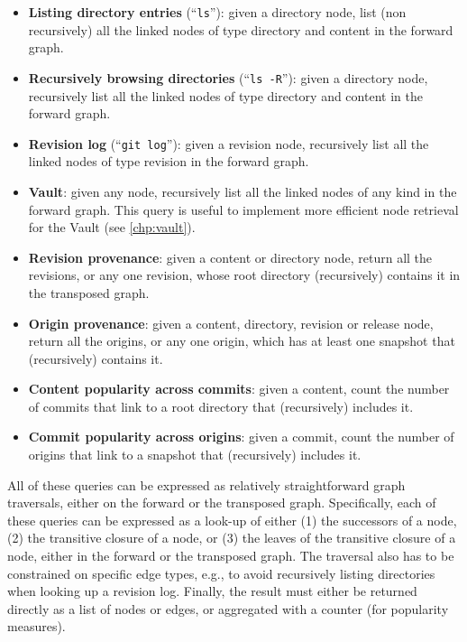 \begin{itemize}
    \item \textbf{Listing directory entries} (``\texttt{ls}''): given a
        directory node, list (non recursively) all the linked nodes of type
        directory and content in the forward graph.
    \item \textbf{Recursively browsing directories} (``\texttt{ls -R}''): given
        a directory node, recursively list all the linked nodes of type
        directory and content in the forward graph.
    \item \textbf{Revision log} (``\texttt{git log}''): given
        a revision node, recursively list all the linked nodes of type
        revision in the forward graph.
    \item \textbf{Vault}: given any node, recursively list all the linked nodes
        of any kind in the forward graph. This query is useful to implement
        more efficient node retrieval for the Vault (see \cref{chp:vault}).
    \item \textbf{Revision provenance}: given a content or directory node,
        return all the revisions, or any one revision, whose root directory
        (recursively) contains it in the transposed graph.
    \item \textbf{Origin provenance}: given a content, directory, revision or
        release node, return all the origins, or any one origin, which has at
        least one snapshot that (recursively) contains it.
    \item \textbf{Content popularity across commits}: given a content, count
        the number of commits that link to a root directory that (recursively)
        includes it.
    \item \textbf{Commit popularity across origins}: given a commit, count
        the number of origins that link to a snapshot that (recursively)
        includes it.
\end{itemize}

All of these queries can be expressed as relatively straightforward graph
traversals, either on the forward or the transposed graph. Specifically, each
of these queries can be expressed as a look-up of either (1) the successors of
a node, (2) the transitive closure of a node, or (3) the leaves of the
transitive closure of a node, either in the forward or the transposed graph.
The traversal also has to be constrained on specific edge types, e.g., to avoid
recursively listing directories when looking up a revision log. Finally, the
result must either be returned directly as a list of nodes or edges, or
aggregated with a counter (for popularity measures).

